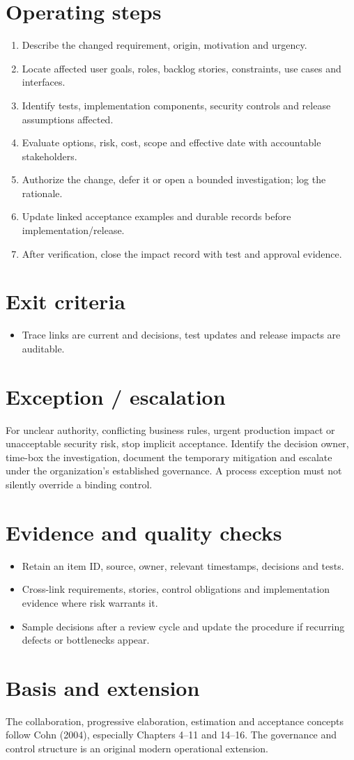 \documentclass[11pt,letterpaper]{article}
\begin{document}
\section{Operating steps}
\begin{enumerate}[leftmargin=*,itemsep=3pt]
\item Describe the changed requirement, origin, motivation and urgency.
\item Locate affected user goals, roles, backlog stories, constraints, use cases and interfaces.
\item Identify tests, implementation components, security controls and release assumptions affected.
\item Evaluate options, risk, cost, scope and effective date with accountable stakeholders.
\item Authorize the change, defer it or open a bounded investigation; log the rationale.
\item Update linked acceptance examples and durable records before implementation/release.
\item After verification, close the impact record with test and approval evidence.
\end{enumerate}
\section{Exit criteria}
\begin{itemize}[leftmargin=*,itemsep=2pt]
\item Trace links are current and decisions, test updates and release impacts are auditable.
\end{itemize}
\section{Exception / escalation}
For unclear authority, conflicting business rules, urgent production impact or unacceptable security risk, stop implicit acceptance. Identify the decision owner, time-box the investigation, document the temporary mitigation and escalate under the organization’s established governance. A process exception must not silently override a binding control.

\section{Evidence and quality checks}
\begin{itemize}[leftmargin=*,itemsep=2pt]
\item Retain an item ID, source, owner, relevant timestamps, decisions and tests.
\item Cross-link requirements, stories, control obligations and implementation evidence where risk warrants it.
\item Sample decisions after a review cycle and update the procedure if recurring defects or bottlenecks appear.
\end{itemize}
\section{Basis and extension}
The collaboration, progressive elaboration, estimation and acceptance concepts follow Cohn (2004), especially Chapters 4–11 and 14–16. The governance and control structure is an original modern operational extension.
\end{document}
